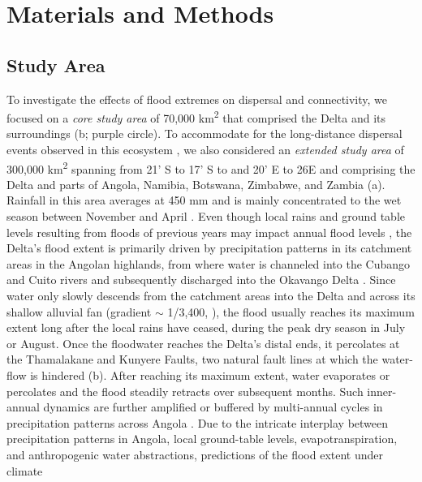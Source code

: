 \documentclass[../FinalThesis.tex]{subfiles}
\begin{document}
\section{Materials and Methods}

\subsection{Study Area}

To investigate the effects of flood extremes on dispersal and connectivity, we
focused on a \textit{core study area} of 70,000 km\textsuperscript{2} that
comprised the Delta and its surroundings (b; purple circle).
To accommodate for the long-distance dispersal events observed in this ecosystem
\citep{Cozzi.2020, Hofmann.2021, Cozzi.2023}, we also considered an
\textit{extended study area} of  300,000 km\textsuperscript{2} spanning from
21' S to 17' S to and 20' E to 26\degree E and
comprising the Delta and parts of Angola, Namibia, Botswana, Zimbabwe, and
Zambia (a). Rainfall in this area averages at 450 mm and is
mainly concentrated to the wet season between November and April
\citep{Mendelsohn.2004}. Even though local rains and ground table levels
resulting from floods of previous years may impact annual flood levels
\citep{McCarthy.2006}, the Delta's flood extent is primarily driven by
precipitation patterns in its catchment areas in the Angolan highlands, from
where water is channeled into the Cubango and Cuito rivers and subsequently
discharged into the Okavango Delta \citep{McCarthy.1997, McCarthy.2003}. Since
water only slowly descends from the catchment areas into the Delta and across
its shallow alluvial fan (gradient $\sim$ 1/3,400, \citealp{McCarthy.1997}), the
flood usually reaches its maximum extent long after the local rains have ceased,
during the peak dry season in July or August. Once the floodwater reaches the
Delta's distal ends, it percolates at the Thamalakane and Kunyere Faults, two
natural fault lines at which the water-flow is hindered (b).
After reaching its maximum extent, water evaporates or percolates and the flood
steadily retracts over subsequent months. Such inner-annual dynamics are further
amplified or buffered by multi-annual cycles in precipitation patterns across
Angola \citep{Wolski.2012}. Due to the intricate interplay between precipitation
patterns in Angola, local ground-table levels, evapotranspiration, and
anthropogenic water abstractions, predictions of the flood extent under climate
\end{document}

